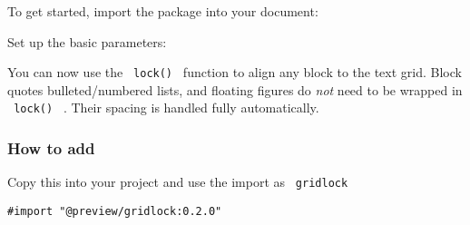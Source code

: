 To get started, import the package into your document:

\begin{Shaded}
\begin{Highlighting}[]
\end{Highlighting}
\end{Shaded}

Set up the basic parameters:

\begin{Shaded}
\begin{Highlighting}[]
\NormalTok{)}
\end{Highlighting}
\end{Shaded}

You can now use the \texttt{\ lock()\ } function to align any block to
the text grid. Block quotes bulleted/numbered lists, and floating
figures do \emph{not} need to be wrapped in \texttt{\ lock()\ } . Their
spacing is handled fully automatically.

\begin{Shaded}
\begin{Highlighting}[]


\NormalTok{))}



\end{Highlighting}
\end{Shaded}

\subsubsection{How to add}\label{how-to-add}

Copy this into your project and use the import as \texttt{\ gridlock\ }

\begin{verbatim}
#import "@preview/gridlock:0.2.0"
\end{verbatim}



